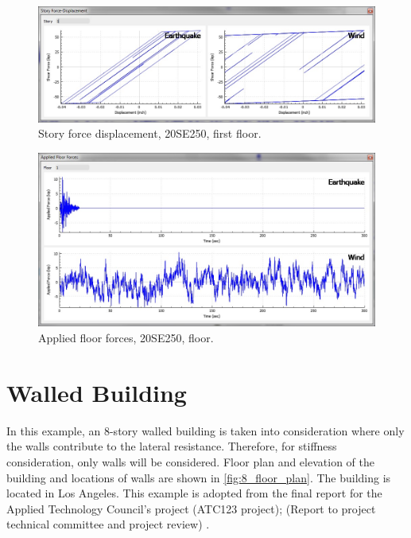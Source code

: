 \documentclass{simcenterdocumentation}
\begin{document}
\begin{figure}[H]
	\centering \includegraphics[scale=0.35]{20SE250_sfd.jpg}
	\caption{Story force displacement, 20SE250, first floor.}
\end{figure}
\begin{figure}[H]
	\centering \includegraphics[scale=0.35]{20SE250_aff.jpg}
	\caption{Applied floor forces, 20SE250,  floor.}
\end{figure}





\section{Walled Building}
In this example, an 8-story walled building is taken into consideration where only the walls contribute to the lateral resistance. Therefore, for stiffness consideration, only walls will be considered. Floor plan and elevation of the building and locations of walls are shown in \cref{fig:8_floor_plan}. The building is located in Los Angeles. This example is adopted from  the final report for the Applied Technology Council’s project (ATC123 project); (Report to project technical committee and project review) \cite{FEMAp2012}.
\end{document}
